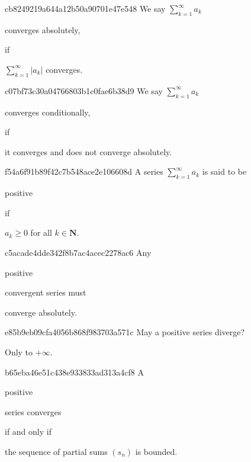 \begin{note}{cb8249219a644a12b50a90701e47e548}
    We say \({ \sum_{k=1}^{\infty} a_k }\) \begin{icloze}{2}converges absolutely,\end{icloze} if \begin{icloze}{1}\({ \sum_{k=1}^{\infty} \left\lvert a_k \right\rvert }\) converges.\end{icloze}
\end{note}

\begin{note}{c07bf73c30a04766803b1c0fae6b38d9}
    We say \({ \sum_{k=1}^{\infty} a_k }\) \begin{icloze}{2}converges conditionally,\end{icloze} if \begin{icloze}{1}it converges and does not converge absolutely.\end{icloze}
\end{note}

\begin{note}{f54a6f91b89f42c7b548ace2e106608d}
    A series \({ \sum_{k=1}^{\infty} a_k }\) is said to be \begin{icloze}{2}positive\end{icloze} if \begin{icloze}{1}\({ a_k \geq 0 }\) for all \({ k \in \mathbf{N} }\).\end{icloze}
\end{note}

\begin{note}{c5acade4dde342f8b7ac4acec2278ac6}
    Any \begin{icloze}{2}positive\end{icloze} convergent series must \begin{icloze}{1}converge absolutely.\end{icloze}
\end{note}

\begin{note}{e85b9eb09cfa4056b868f983703a571c}
    May a positive series diverge?

    \begin{cloze}{1}
        Only to \({ +\infty }\).
    \end{cloze}
\end{note}

\begin{note}{b65eba46e51c438e933833ad313a4cf8}
    A \begin{icloze}{2}positive\end{icloze} series converges \begin{icloze}{3}if and only if\end{icloze} \begin{icloze}{1}the sequence of partial sums \({ (s_n) }\) is bounded.\end{icloze}
\end{note}

